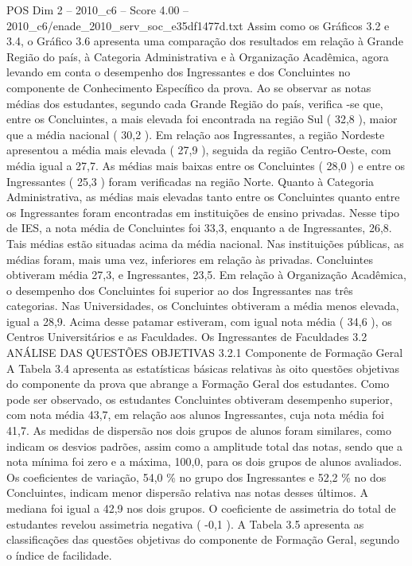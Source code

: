 \begin{textsample}{POS Dim 2 – 2010\_c6 – Score 4.00 – 2010\_c6/enade\_2010\_serv\_soc\_e35df1477d.txt}
Assim como os Gráficos 3.2 e 3.4, o Gráfico 3.6 apresenta uma comparação dos resultados em relação à Grande Região do país, à Categoria Administrativa e à Organização Acadêmica, agora levando em conta o desempenho dos Ingressantes e dos Concluintes no componente de Conhecimento Específico da prova.
Ao se observar as notas médias dos estudantes, segundo cada Grande Região do país, verifica -se que, entre os Concluintes, a mais elevada foi encontrada na região Sul ( 32,8 ), maior que a média nacional ( 30,2 ).
Em relação aos Ingressantes, a região Nordeste apresentou a média mais elevada ( 27,9 ), seguida da região Centro-Oeste, com média igual a 27,7.
As médias mais baixas entre os Concluintes ( 28,0 ) e entre os Ingressantes ( 25,3 ) foram verificadas na região Norte.
Quanto à Categoria Administrativa, as médias mais elevadas tanto entre os Concluintes quanto entre os Ingressantes foram encontradas em instituições de ensino privadas.
Nesse tipo de IES, a nota média de Concluintes foi 33,3, enquanto a de Ingressantes, 26,8.
Tais médias estão situadas acima da média nacional.
Nas instituições públicas, as médias foram, mais uma vez, inferiores em relação às privadas.
Concluintes obtiveram média 27,3, e Ingressantes, 23,5.
Em relação à Organização Acadêmica, o desempenho dos Concluintes foi superior ao dos Ingressantes nas três categorias.
Nas Universidades, os Concluintes obtiveram a média menos elevada, igual a 28,9.
Acima desse patamar estiveram, com igual nota média ( 34,6 ), os Centros Universitários e as Faculdades.
Os Ingressantes de Faculdades 3.2 ANÁLISE DAS QUESTÕES OBJETIVAS 3.2.1 Componente de Formação Geral A Tabela 3.4 apresenta as estatísticas básicas relativas às oito questões objetivas do componente da prova que abrange a Formação Geral dos estudantes.
Como pode ser observado, os estudantes Concluintes obtiveram desempenho superior, com nota média 43,7, em relação aos alunos Ingressantes, cuja nota média foi 41,7.
As medidas de dispersão nos dois grupos de alunos foram similares, como indicam os desvios padrões, assim como a amplitude total das notas, sendo que a nota mínima foi zero e a máxima, 100,0, para os dois grupos de alunos avaliados.
Os coeficientes de variação, 54,0 \% no grupo dos Ingressantes e 52,2 \% no dos Concluintes, indicam menor dispersão relativa nas notas desses últimos.
A mediana foi igual a 42,9 nos dois grupos.
O coeficiente de assimetria do total de estudantes revelou assimetria negativa ( -0,1 ).
A Tabela 3.5 apresenta as classificações das questões objetivas do componente de Formação Geral, segundo o índice de facilidade.

\end{textsample}
